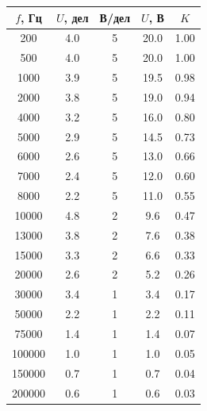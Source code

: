 \documentclass[14pt]{article}
\begin{document}
\begin{center}
\begin{tabular}{|c|c|c|c|c|}
\hline
$f$, Гц		&	$U$, дел	&	В/дел	&	$U$, В	&	$K$\\
\hline
200			&	4.0			&	5		&	20.0	&	1.00\\
\hline
500			&	4.0			&	5		&	20.0	&	1.00\\
\hline
1000		&	3.9			&	5		&	19.5	&	0.98\\
\hline
2000		&	3.8			&	5		&	19.0	&	0.94\\
\hline
4000		&	3.2			&	5		&	16.0	&	0.80\\
\hline
5000		&	2.9			&	5		&	14.5	&	0.73\\
\hline
6000		&	2.6			&	5		&	13.0	&	0.66\\
\hline
7000		&	2.4			&	5		&	12.0	&	0.60\\
\hline
8000		&	2.2			&	5		&	11.0	&	0.55\\
\hline
10000		&	4.8			&	2		&	9.6		&	0.47\\
\hline
13000		&	3.8			&	2		&	7.6		&	0.38\\
\hline
15000		&	3.3			&	2		&	6.6		&	0.33\\
\hline
20000		&	2.6			&	2		&	5.2		&	0.26\\
\hline
30000		&	3.4			&	1		&	3.4		&	0.17\\
\hline
50000		&	2.2			&	1		&	2.2		&	0.11\\
\hline
75000		&	1.4			&	1		&	1.4		&	0.07\\
\hline
100000		&	1.0			&	1		&	1.0		&	0.05\\
\hline
150000		&	0.7			&	1		&	0.7		&	0.04\\
\hline
200000		&	0.6			&	1		&	0.6		&	0.03\\
\hline
\end{tabular}
\end{center}

\vspace{0.5cm}
\begin{center}
\end{center}
\end{document}

